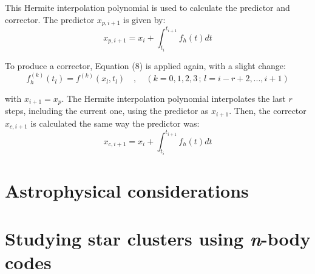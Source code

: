 \documentclass{article}
\begin{document}
This Hermite interpolation polynomial is used to calculate the predictor and corrector. The predictor $x_{p,i+1}$ is given by:
\begin{equation}
x_{p,i+1} = x_i + \int_{t_i}^{t_{i+1}} f_h(t)dt
\end{equation}

To produce a corrector, Equation (8) is applied again, with a slight change:
\begin{equation}
f^{(k)}_h(t_l) = f^{(k)}(x_l,t_l) \quad,\quad (k=0,1,2,3\,;\,l=i-r+2,...,i+1)
\end{equation}

with $x_{i+1} = x_p$. The Hermite interpolation polynomial interpolates the last $r$ steps, including the current one, using the predictor as $x_{i+1}$. Then, the corrector $x_{c,i+1}$ is calculated the same way the predictor was:
\begin{equation}
x_{c,i+1} = x_i + \int_{t_i}^{t_{i+1}} f_h(t)dt
\end{equation}

\section{Astrophysical considerations}

\section{Studying star clusters using \textit{n}-body codes}





\end{document}
